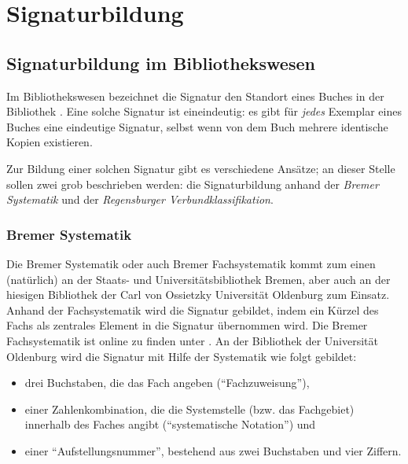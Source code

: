 \section{Signaturbildung}%
\subsection{Signaturbildung im Bibliothekswesen}

Im Bibliothekswesen bezeichnet die Signatur  den Standort eines Buches  in der  
Bibliothek \cite{signatur_begriff}.
Eine solche Signatur ist eineindeutig: es gibt f\"ur \textit{jedes} Exemplar eines Buches eine
eindeutige Signatur, selbst wenn von dem Buch mehrere identische Kopien existieren.

Zur Bildung einer solchen Signatur gibt es verschiedene Ans\"atze; an dieser Stelle
sollen zwei grob beschrieben werden: die Signaturbildung anhand der \textit{Bremer Systematik} und der 
\textit{Regensburger Verbundklassifikation}. 

\subsubsection{Bremer Systematik}

Die Bremer Systematik oder auch Bremer Fachsystematik kommt zum einen (nat\"urlich) an
der Staats- und Universit\"atsbibliothek Bremen, aber auch an der hiesigen Bibliothek der
Carl von Ossietzky Universit\"at Oldenburg zum Einsatz. Anhand der Fachsystematik wird
die Signatur gebildet, indem ein K\"urzel des Fachs als zentrales Element in die Signatur
\"ubernommen wird. Die Bremer Fachsystematik ist online zu finden unter \cite{fachsystematik}.
An der Bibliothek der Universit\"at Oldenburg wird die Signatur mit Hilfe der Systematik wie
folgt gebildet:

\begin{itemize}

\item drei Buchstaben, die das Fach angeben (``Fachzuweisung''),
\item einer Zahlenkombination, die die Systemstelle (bzw. das Fachgebiet)
    innerhalb des Faches angibt (``systematische Notation'') und
\item einer ``Aufstellungsnummer'', bestehend aus zwei Buchstaben und vier Ziffern.

\end{itemize}

